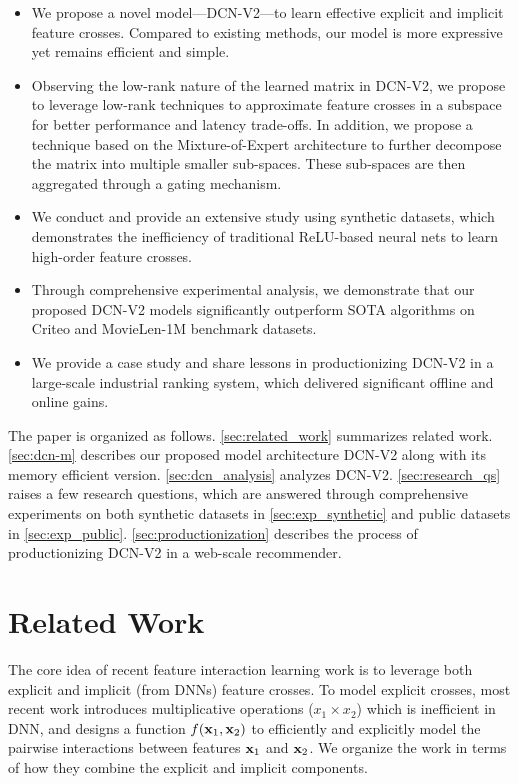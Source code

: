 \documentclass[sigconf]{acmart}
\newcommand{\vecx}{{\bf x}}
\begin{document}
\begin{itemize}[leftmargin=1em]
    \item We propose a novel model---{DCN-V2}---to learn effective explicit and implicit feature crosses. Compared to existing methods, our model is more expressive yet remains efficient and simple.
    \item Observing the low-rank nature of the learned matrix in {DCN-V2}, we propose to leverage low-rank techniques to approximate feature crosses in a subspace for better performance and latency trade-offs. In addition, we propose a technique based on the Mixture-of-Expert architecture \cite{shazeer2017outrageously, jacobs1991adaptive} to further decompose the matrix into multiple smaller sub-spaces. These sub-spaces are then aggregated through a gating mechanism.
    \item We conduct and provide an extensive study using synthetic datasets, which demonstrates the inefficiency of traditional ReLU-based neural nets to learn high-order feature crosses.
    \item Through comprehensive experimental analysis, we demonstrate that our proposed {DCN-V2} models significantly outperform SOTA algorithms on Criteo and MovieLen-1M benchmark datasets.
\item We provide a case study and share lessons in productionizing {DCN-V2} in a large-scale industrial ranking system, which delivered significant offline and online gains.
\end{itemize}


The paper is organized as follows. \autoref{sec:related_work} summarizes related work. \autoref{sec:dcn-m} describes our proposed model architecture {DCN-V2} along with its memory efficient version. \autoref{sec:dcn_analysis} analyzes {DCN-V2}. \autoref{sec:research_qs} raises a few research questions, which are answered through comprehensive experiments on both synthetic datasets in \autoref{sec:exp_synthetic} and public datasets in \autoref{sec:exp_public}. \autoref{sec:productionization} describes the process of productionizing {DCN-V2} in a web-scale recommender. 

\section{Related Work}
\label{sec:related_work}




The core idea of recent feature interaction learning work is to leverage both explicit and implicit (from DNNs) feature crosses. To model explicit crosses, most recent work introduces multiplicative operations ($x_1 \times x_2$) which is inefficient in DNN, and designs a function $f(\vecx_1, \vecx_2)$ to efficiently and explicitly model the pairwise interactions between features $\vecx_1$ and $\vecx_2$. We organize the work in terms of how they combine the explicit and implicit components.
\end{document}
